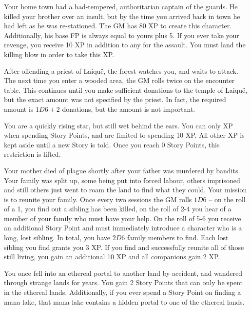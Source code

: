 \begin{multicols}{2}
\begin{list}{\addtocounter{list}{1}\textbf{:}}{\raggedleft}
	\item{Your home town had a bad-tempered, authoritarian captain of the guards.
He killed your brother over an insult, but by the time you arrived back in town he had left as he was re-stationed.
The GM has 80 XP to create this character.
Additionally, his base FP is always equal to yours plus 5.
If you ever take your revenge, you receive 10 XP in addition to any for the assault.
You must land the killing blow in order to take this XP.}
	\item{After offending a priest of Laiqu\"{e}, the forest watches you, and waits to attack.
	The next time you enter a wooded area, the GM rolls twice on the encounter table.
	This continues until you make sufficient donations to the temple of Laiqu\"e, but the exact amount was not specified by the priest.
	In fact, the required amount is $1D6 + 2$ donations, but the amount is not important.
	}

	\item{You are a quickly rising star, but still wet behind the ears.
	You can only XP when spending Story Points, and are limited to spending 10 XP.
	All other XP is kept aside until a new Story is told.
	Once you reach 0 Story Points, this restriction is lifted.}
	
	\item{Your mother died of plague shortly after your father was murdered by bandits.
	Your family was split up, some being put into forced labour, others imprisoned and still others just went to roam the land to find what they could.
	Your mission is to reunite your family.
	Once every two sessions the GM rolls $1D6$ -- on the roll of a 1, you find out a sibling has been killed, on the roll of 2-4 you hear of a member of your family who must have your help.
	On the roll of 5-6 you receive an additional Story Point and must immediately introduce a character who is a long, lost sibling.
	In total, you have $2D6$ family members to find.
	Each lost sibling you find grants you 3 XP.
	If you find and successfully reunite all of those still living, you gain an additional 10 XP and all companions gain 2 XP.}

	\item{You once fell into an ethereal portal to another land by accident, and wandered through strange lands for years.  You gain 2 Story Points that can only be spent in the ethereal lands.  Additionally, if you ever spend a Story Point on finding a mana lake, that mana lake contains a hidden portal to one of the ethereal lands.}


\end{list}
\end{multicols}
